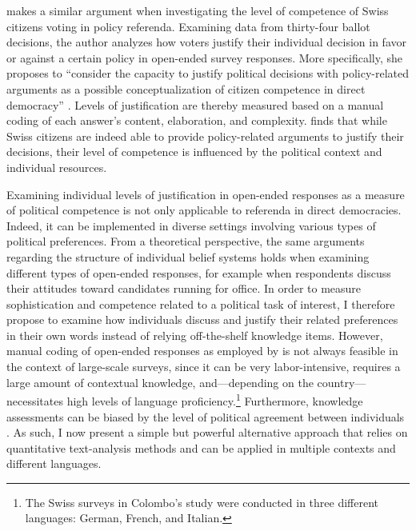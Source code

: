 \documentclass[12pt]{article}
\begin{document}
\citet{colombo2016justifications} makes a similar argument when investigating the level of competence of Swiss citizens voting in policy referenda. Examining data from thirty-four ballot decisions, the author analyzes how voters justify their individual decision in favor or against a certain policy in open-ended survey responses. More specifically, she proposes to ``consider the capacity to justify political decisions with policy-related arguments as a possible conceptualization of citizen competence in direct democracy'' \citep[3]{colombo2016justifications}. Levels of justification are thereby measured based on a manual coding of each answer's content, elaboration, and complexity. \citet{colombo2016justifications} finds that while Swiss citizens are indeed able to provide policy-related arguments to justify their decisions, their level of competence is influenced by the political context and individual resources.

Examining individual levels of justification in open-ended responses as a measure of political competence is not only applicable to referenda in direct democracies. Indeed, it can be implemented in diverse settings involving various types of political preferences. From a theoretical perspective, the same arguments regarding the structure of individual belief systems holds when examining different types of open-ended responses, for example when respondents discuss their attitudes toward candidates running for office. In order to measure sophistication and competence related to a political task of interest, I therefore propose to examine how individuals discuss and justify their related preferences in their own words instead of relying off-the-shelf knowledge items. However, manual coding of open-ended responses as employed by \citet{colombo2016justifications} is not always feasible in the context of large-scale surveys, since it can be very labor-intensive, requires a large amount of contextual knowledge, and---depending on the country---necessitates high levels of language proficiency.\footnote{The Swiss surveys in Colombo's \citeyearpar{colombo2016justifications} study were conducted in three different languages: German, French, and Italian.} Furthermore, knowledge assessments can be biased by the level of political agreement between individuals \citep{ryan2011accuracy}. As such, I now present a simple but powerful alternative approach that relies on quantitative text-analysis methods and can be applied in multiple contexts and different languages.
\end{document}
